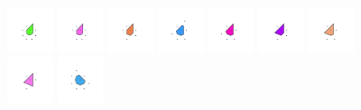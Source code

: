 \documentclass[text.tex]{subfiles}
\begin{document}
\begin{figure}[h!]
\includegraphics[width=0.12\textwidth]{img/results/octagon/octagon_226776_(-3_5alpha_4)_005.pdf}
\includegraphics[width=0.12\textwidth]{img/results/octagon/octagon_226776_(-3_5alpha_4)_006.pdf}
\includegraphics[width=0.12\textwidth]{img/results/octagon/octagon_226776_(-3_5alpha_4)_007.pdf}
\includegraphics[width=0.12\textwidth]{img/results/octagon/octagon_226776_(-3_5alpha_4)_008.pdf}
\includegraphics[width=0.12\textwidth]{img/results/octagon/octagon_226776_(-3_5alpha_4)_009.pdf}
\includegraphics[width=0.12\textwidth]{img/results/octagon/octagon_226776_(-3_5alpha_4)_010.pdf}
\includegraphics[width=0.12\textwidth]{img/results/octagon/octagon_226776_(-3_5alpha_4)_011.pdf}
\includegraphics[width=0.12\textwidth]{img/results/octagon/octagon_226776_(-3_5alpha_4)_012.pdf}
\includegraphics[width=0.12\textwidth]{img/results/octagon/octagon_226776_(-3_5alpha_4)_013.pdf}

\end{figure}
\end{document}
